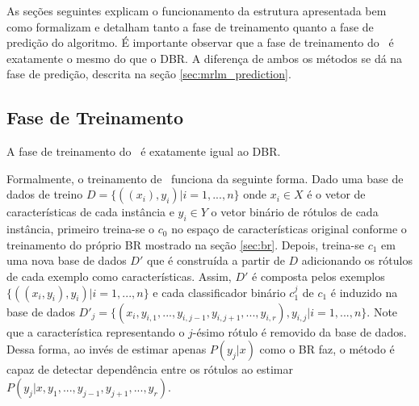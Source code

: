 \begin{itemize}
  
%   
  
\end{itemize}
  As seções seguintes explicam o funcionamento da estrutura apresentada 
  bem como formalizam e detalham tanto a fase de treinamento quanto a fase de predição do algoritmo.
  É importante observar que a fase de treinamento do \MRLMa~é exatamente o mesmo do que o DBR.
  A diferença de ambos os métodos se dá na fase de predição, descrita na seção \ref{sec:mrlm_prediction}.
 
 
 \subsection{Fase de Treinamento}
 \label{sec:mrlm_train}
  A fase de treinamento do \MRLMa~é exatamente igual ao DBR.
  
  Formalmente, o treinamento de \MRLM~funciona da seguinte forma.
  Dado uma base de dados de treino $D=\{((x_i),y_i)|i=1,...,n\}$ onde $x_i \in X$ é o vetor de características de cada instância
  e $y_i \in Y$ o vetor binário de rótulos de cada instância,
  primeiro treina-se o $c_0$
  no espaço de características original conforme o treinamento do próprio BR mostrado na seção \ref{sec:br}.
  Depois, treina-se $c_1$ em uma nova base de dados $D'$ que é construída a partir de $D$ adicionando os rótulos de cada
  exemplo como características. Assim, $D'$ é composta pelos exemplos $\{((x_i,y_i),y_i) |i=1,...,n\}$ e
  cada classificador binário $c_1^j$ de $c_1$ é induzido na base de dados $D'_j=\{(x_i,y_{i,1},...,y_{i,j-1},y_{i,j+1},...,y_{i,r}),y_{i,j} | i=1,...,n\}$.
  Note que a característica representando o $j$-ésimo rótulo é removido da base de dados.
  Dessa forma, ao invés de estimar apenas $P(y_j|x)$ como o BR faz, o método é capaz de detectar dependência entre os rótulos ao
  estimar $P(y_j|x,y_1,...,y_{j-1},y_{j+1},...,y_r)$.
 

